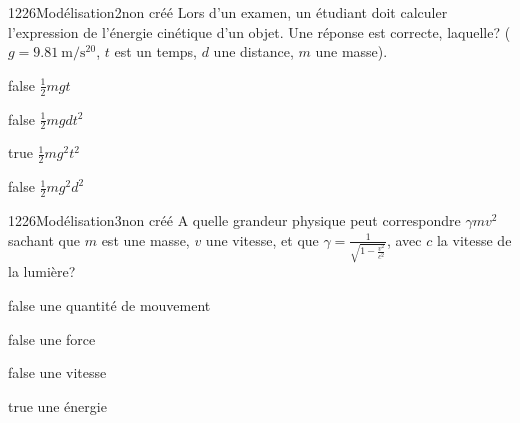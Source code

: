 \documentclass[11pt]{article}
\begin{document}
            \begin{question}{1226}{Modélisation}{2}{non créé}
				Lors d'un examen, un étudiant doit calculer l'expression de l'énergie cinétique d'un objet. Une réponse est correcte, laquelle? ($g=\SI{9,81}{\meter\per\second^20}$, $t$ est un temps, $d$ une distance, $m$ une masse).
            \end{question}

            \begin{reponses}
                \item[false] $\frac{1}{2}mgt$
                \item[false] $\frac{1}{2}mgdt^2$
                \item[true] $\frac{1}{2}mg^2t^2$
                \item[false] $\frac{1}{2}mg^2d^2$
            \end{reponses}
        
        	\begin{question}{1226}{Modélisation}{3}{non créé}
				A quelle grandeur physique peut correspondre $\gamma m v^2$ sachant que $m$ est une masse, $v$ une vitesse, et que $\gamma=\frac{1}{\sqrt{1-\frac{v^2}{c^2}}}$, avec $c$ la vitesse de la lumière?
            \end{question}

            \begin{reponses}
            	\item[false] une quantité de mouvement
            	\item[false] une force
                \item[false] une vitesse
                \item[true] une énergie
            \end{reponses}
    	
\end{document}
